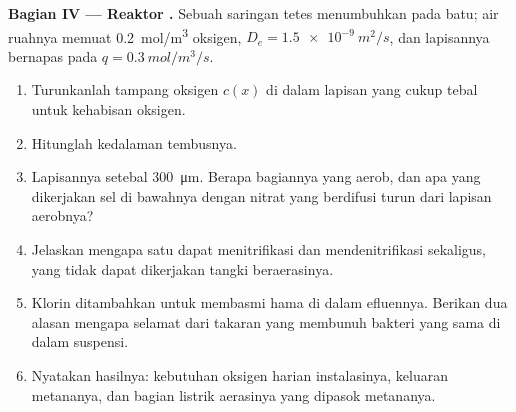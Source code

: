 \begin{problem}
\medskip
\noindent\textbf{Bagian IV --- Reaktor .}
Sebuah saringan tetes menumbuhkan  pada batu; air ruahnya memuat
\qty{0.2}{mol/m^3} oksigen, $D_e = \qty{1.5e-9}{m^2/s}$, dan
lapisannya bernapas pada $q = \qty{0.3}{mol/m^3/s}$.
\begin{enumerate}[resume]
  \item Turunkanlah tampang oksigen $c(x)$ di dalam lapisan yang cukup
        tebal untuk kehabisan oksigen.
  \item Hitunglah kedalaman tembusnya.
  \item Lapisannya setebal \qty{300}{\micro m}. Berapa bagiannya yang
        aerob, dan apa yang dikerjakan sel di bawahnya dengan nitrat
        yang berdifusi turun dari lapisan aerobnya?
  \item Jelaskan mengapa satu  dapat menitrifikasi dan
        mendenitrifikasi sekaligus, yang tidak dapat dikerjakan tangki
        beraerasinya.
  \item Klorin ditambahkan untuk membasmi hama di dalam efluennya.
        Berikan dua alasan mengapa  selamat dari takaran yang
        membunuh bakteri yang sama di dalam suspensi.
  \item Nyatakan hasilnya: kebutuhan oksigen harian instalasinya,
        keluaran metananya, dan bagian listrik aerasinya yang dipasok
        metananya.
\end{enumerate}
\end{problem}
